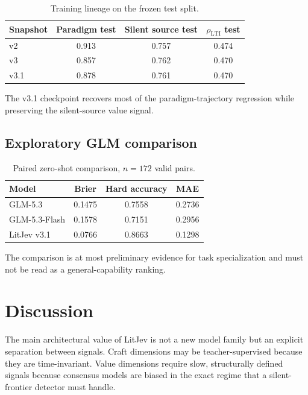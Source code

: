 \documentclass[11pt]{article}
\begin{document}
\begin{table}[t]
\centering
\begin{tabular}{@{}lccc@{}}
\toprule
Snapshot & Paradigm test & Silent source test & \(\rho_{\mathrm{LTI}}\) test \\
\midrule
v2 & 0.913 & 0.757 & 0.474 \\
v3 & 0.857 & 0.762 & 0.470 \\
v3.1 & 0.878 & 0.761 & 0.470 \\
\bottomrule
\end{tabular}
\caption{Training lineage on the frozen test split.}
\label{tab:lineage}
\end{table}

The v3.1 checkpoint recovers most of the paradigm-trajectory regression while
preserving the silent-source value signal.

\subsection{Exploratory GLM comparison}

\begin{table}[t]
\centering
\begin{tabular}{@{}lccc@{}}
\toprule
Model & Brier & Hard accuracy & MAE \\
\midrule
GLM-5.3 & 0.1475 & 0.7558 & 0.2736 \\
GLM-5.3-Flash & 0.1578 & 0.7151 & 0.2956 \\
LitJev v3.1 & 0.0766 & 0.8663 & 0.1298 \\
\bottomrule
\end{tabular}
\caption{Paired zero-shot comparison, \(n=172\) valid pairs.}
\label{tab:glm}
\end{table}

The comparison is at most preliminary evidence for task specialization and
must not be read as a general-capability ranking.

\section{Discussion}

The main architectural value of LitJev is not a new model family but an
explicit separation between signals. Craft dimensions may be teacher-supervised
because they are time-invariant. Value dimensions require slow, structurally
defined signals because consensus models are biased in the exact regime that a
silent-frontier detector must handle.
\end{document}
